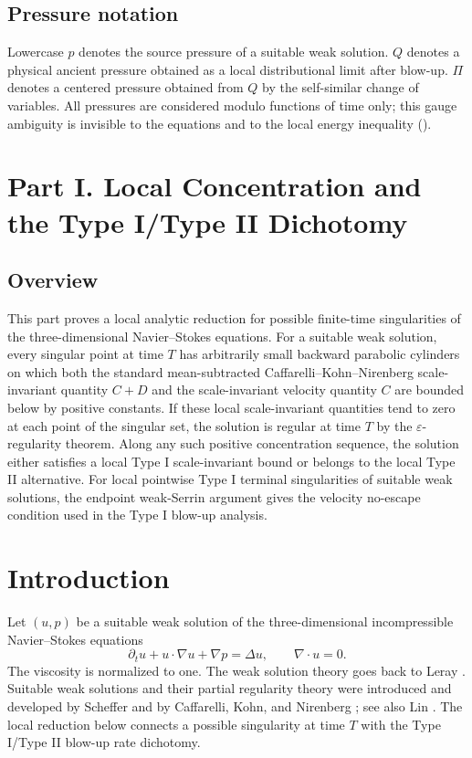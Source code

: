 \documentclass[11pt]{amsart}
\theoremstyle{plain}
\theoremstyle{definition}
\theoremstyle{remark}
\numberwithin{equation}{section}
\begin{document}
\subsection*{Pressure notation}

Lowercase \(p\) denotes the source pressure of a suitable weak solution.
\(Q\) denotes a physical ancient pressure obtained as a local distributional
limit after blow-up.  \(\Pi\) denotes a centered pressure obtained from
\(Q\) by the self-similar change of variables.  All pressures are
considered modulo functions of time only; this gauge ambiguity is invisible
to the equations and to the local energy inequality
().

\clearpage
\section*{Part I. Local Concentration and the Type I/Type II Dichotomy}

\subsection*{Overview}

This part proves a local analytic reduction for possible finite-time
singularities of the three-dimensional Navier--Stokes equations.  For a
suitable weak solution,
every singular point at time \(T\) has arbitrarily small backward parabolic
cylinders on which both the standard mean-subtracted
Caffarelli--Kohn--Nirenberg scale-invariant quantity \(C+D\) and the
scale-invariant velocity quantity \(C\) are bounded below by positive
constants.  If these local scale-invariant quantities tend to zero at each
point of the singular set, the solution is regular at time \(T\) by the
\(\varepsilon\)-regularity theorem.  Along any such positive concentration
sequence, the solution either satisfies a local Type I scale-invariant bound or
belongs to the local Type II alternative.  For local pointwise Type I terminal
singularities of suitable weak solutions, the endpoint weak-Serrin argument gives
the velocity no-escape condition
used in the Type I blow-up analysis.

\section{Introduction}

Let \((u,p)\) be a suitable weak solution of the three-dimensional
incompressible Navier--Stokes equations
\[
  \partial_t u+u\cdot\nabla u+\nabla p=\Delta u,
  \qquad \nabla\cdot u=0.
\]
The viscosity is normalized to one.  The weak
solution theory goes back to Leray \cite{Leray1934}.  Suitable weak solutions
and their partial regularity theory were introduced and developed by Scheffer
\cite{Scheffer1976} and by Caffarelli, Kohn, and Nirenberg \cite{CKN1982}; see
also Lin \cite{Lin1998}.  The local reduction below connects a possible
singularity at time \(T\) with the Type I/Type II blow-up rate dichotomy.
\end{document}
